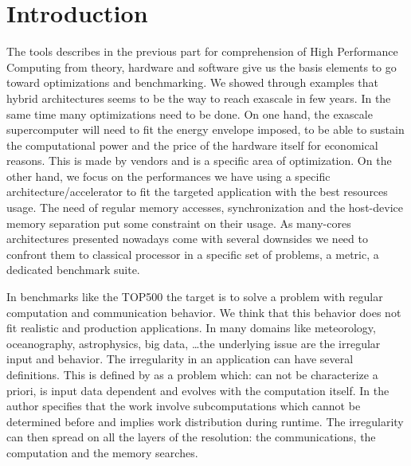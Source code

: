 
\chapter*{Introduction}

The tools describes in the previous part for comprehension of High Performance Computing from theory, hardware and software give us the basis elements to go toward optimizations and benchmarking. 
We showed through examples that hybrid architectures seems to be the way to reach exascale in few years.
In the same time many optimizations need to be done.
On one hand, the exascale supercomputer will need to fit the energy envelope imposed, to be able to sustain the computational power and the price of the hardware itself for economical reasons.  
This is made by vendors and is a specific area of optimization.
On the other hand, we focus on the performances we have using a specific architecture/accelerator to fit the targeted application with the best resources usage. 
The need of regular memory accesses, synchronization and the host-device memory separation put some constraint on their usage.
As many-cores architectures presented nowadays come with several downsides we need to confront them to classical processor in a specific set of problems, a metric, a dedicated benchmark suite.

In benchmarks like the TOP500 the target is to solve a problem with regular computation and communication behavior. 
We think that this behavior does not fit realistic and production applications.
In many domains like meteorology, oceanography, astrophysics, big data, \dots the underlying issue are the irregular input and behavior.
The irregularity in an application can have several definitions. 
This is defined by \cite{javairregular} as a problem which: can not be characterize a priori, is input data dependent and evolves with the computation itself. 
In \cite{suss2006implementing} the author specifies that the work involve subcomputations which cannot be determined before and implies work distribution during runtime.
The irregularity can then spread on all the layers of the resolution:
the communications, the computation and the memory searches. 

